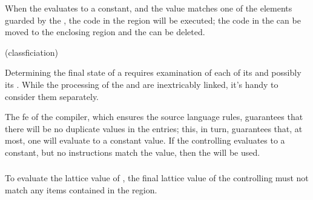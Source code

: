 \begin{observation}\label{obs:ccp-casesgl-guard}
  When the  evaluates to a constant, and the value
  matches one of the elements guarded by the , the
  code in the region will be executed; the code in the
   can be moved to the enclosing region and the
   can be deleted.
\end{observation}

\begin{algorithm}[h!]
  \label{algo:ccp-casesgl-classification}
  \caption{ (classficiation)}
  \begin{algorithmic}[1]
          \ENDIF
        \ELSE
          \STATE{}
          \ENDIF
        \ENDIF
      \ENDFOR
    \ENDIF
  \end{algorithmic}
\end{algorithm}

Determining the final state of a  requires
examination of each of its  and possibly its
.  While the processing of the  and
 are inextricably linked, it's handy to consider
them separately.

The \ac{fe} of the compiler, which ensures the source language rules,
guarantees that there will be no duplicate values in the
 entries; this, in turn, guarantees that, at most,
one  will evaluate to a constant value.  If the
controlling  evaluates to a constant, but no
 instructions match the value, then the
 will be used.

\subsubsection{}
To evaluate the lattice value of , the
final lattice value of the controlling 
must not match any  items contained in the region.


